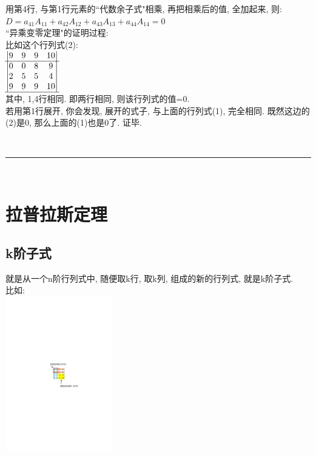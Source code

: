 \documentclass[UTF8]{ctexart}
\begin{document}
	用第4行, 与第1行元素的``代数余子式"相乘, 再把相乘后的值, 全加起来, 则:\\
	$ D= a_{41}A_{11} + a_{42}A_{12} + a_{43}A_{13} + a_{44}A_{14} = 0$ \\
	
	``异乘变零定理"的证明过程: \\	
	比如这个行列式(2): \\
	
	$
	\begin{matrix}
		\left| \begin{matrix}
			9&		9&		9&		10\\
			\hline
			0&		0&		8&		9\\
			2&		5&		5&		4\\
			9&		9&		9&		10\\
			\hline
		\end{matrix} \right|\\
	\end{matrix}
	$ \\
	
	其中, 1,4行相同. 即两行相同, 则该行列式的值=0. \\
	若用第1行展开, 你会发现, 展开的式子, 与上面的行列式(1), 完全相同. 既然这边的(2)是0, 那么上面的(1)也是0了. 证毕. 
	
	
	
	
	
	
~\\
\hrule
~\\
	
	\section{拉普拉斯定理}
	
	\subsection{k阶子式}
	
	就是从一个n阶行列式中, 随便取k行, 取k列, 组成的新的行列式, 就是k阶子式. \\
	比如:\\
\includegraphics[width=0.35\textwidth]{img/0014.pdf} \\
\end{document}
